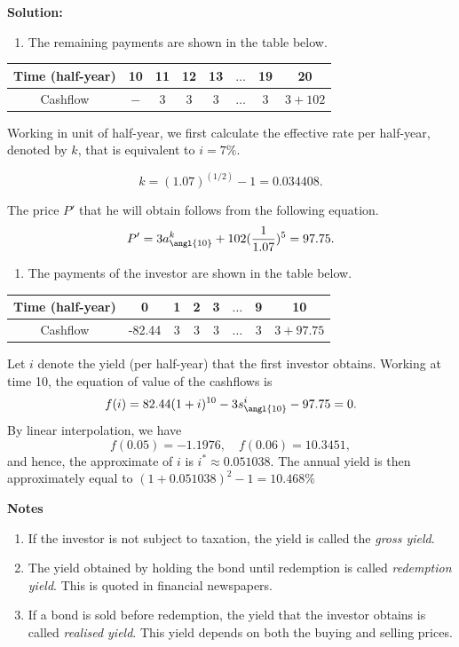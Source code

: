 \documentclass[landscape, 20pt]{extreport}
\providecommand{\tightlist}{%
  \setlength{\itemsep}{0pt}\setlength{\parskip}{0pt}}
\theoremstyle{definition}
\theoremstyle{definition}
\theoremstyle{definition}
\theoremstyle{definition}
\theoremstyle{remark}
\begin{document}
\textbf{Solution:}

\begin{enumerate}
\def\labelenumi{\arabic{enumi}.}
\tightlist
\item
  The remaining payments are shown in the table below.
\end{enumerate}

\begin{longtable}[]{@{}cccccccc@{}}
\toprule
Time (half-year) & 10 & 11 & 12 & 13 & \(\ldots\) & 19 & 20 \\
\midrule
\endhead
Cashflow & \(-\) & 3 & 3 & 3 & \(\ldots\) & \(3\) & \(3 + 102\) \\
\bottomrule
\end{longtable}

Working in unit of half-year, we first calculate the effective rate per half-year, denoted by \(k\), that is equivalent to \(i = 7\%\).

\[ k = (1.07)^{(1/2)} - 1 = 0.034408. \]

The price \(P'\) that he will obtain follows from the following equation.
\[P' = 3 a^k_{\angl{10}} + 102 (\frac{1}{1.07})^{5} = 97.75.\]

\begin{enumerate}
\def\labelenumi{\arabic{enumi}.}
\setcounter{enumi}{1}
\tightlist
\item
  The payments of the investor are shown in the table below.
\end{enumerate}

\begin{longtable}[]{@{}cccccccc@{}}
\toprule
Time (half-year) & 0 & 1 & 2 & 3 & \(\ldots\) & 9 & 10 \\
\midrule
\endhead
Cashflow & -82.44 & 3 & 3 & 3 & \(\ldots\) & \(3\) & \(3 + 97.75\) \\
\bottomrule
\end{longtable}

Let \(i\) denote the yield (per half-year) that the first investor obtains.
Working at time 10, the equation of value of the cashflows is
\[ f(i) = 82.44 (1+i)^{10} - 3 s^i_{\angl{10}} - 97.75 = 0.\]
By linear interpolation, we have
\[ f(0.05) = -1.1976, \quad f(0.06) = 10.3451, \]
and hence, the approximate of \(i\) is \(i^* \approx 0.051038\). The annual yield is then approximately equal to \((1 + 0.051038)^2 - 1 = 10.468\%\)

\textbf{Notes}

\begin{enumerate}
\def\labelenumi{\arabic{enumi}.}
\item
  If the investor is not subject to taxation, the yield is called the
  \emph{gross yield}.
\item
  The yield obtained by holding the bond until redemption is called
  \emph{redemption yield}. This is quoted in financial newspapers.
\item
  If a bond is sold before redemption, the yield that the investor
  obtains is called \emph{realised yield}. This yield depends on both the
  buying and selling prices.
\end{enumerate}
\end{document}

